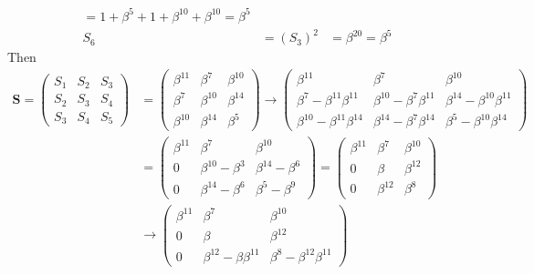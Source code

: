 \documentclass[11pt]{article}
\newcommand{\vc}[1]{\begin{pmatrix}#1\end{pmatrix}}
\begin{document}
\begin{itemize}
\[\begin{array}{lll}
                                        = 1 + \beta^5 + 1 + \beta^{10} + \beta^{10}
                                        = \beta^5\\
                      S_6 &= (S_3)^2   &= \beta^{20} = \beta^5
                    \end{array}
                  \]
                  Then
                  \begin{align*}
                    \mathbf{S} = \vc{S_1 & S_2 & S_3\\
                                     S_2 & S_3 & S_4\\
                                     S_3 & S_4 & S_5}
                              &= \vc{\beta^{11} & \beta^7    & \beta^{10}\\
                                     \beta^7    & \beta^{10} & \beta^{14}\\
                                     \beta^{10} & \beta^{14} & \beta^5}
                              \to\vc{\beta^{11}                        & \beta^7                        & \beta^{10}\\
                                     \beta^7    - \beta^{11}\beta^{11} & \beta^{10} - \beta^7\beta^{11} & \beta^{14} - \beta^{10}\beta^{11} \\
                                     \beta^{10} - \beta^{11}\beta^{14} & \beta^{14} - \beta^7\beta^{14} & \beta^5    - \beta^{10}\beta^{14}}\\
                              &= \vc{\beta^{11}  & \beta^7                        & \beta^{10}\\
                                     0           & \beta^{10} - \beta^3 & \beta^{14} - \beta^6 \\
                                     0           & \beta^{14} - \beta^6 & \beta^5    - \beta^9}
                               = \vc{\beta^{11}  & \beta^7                      & \beta^{10}\\
                                     0           & \beta                        & \beta^{12} \\
                                     0           & \beta^{12}                   & \beta^8}\\
                             &\to\vc{\beta^{11}  & \beta^7                      & \beta^{10}\\
                                     0           & \beta                        & \beta^{12} \\
                                     0           & \beta^{12} - \beta\beta^{11} & \beta^8 - \beta^{12}\beta^{11}}

\end{align*}
\end{itemize}
\end{document}
